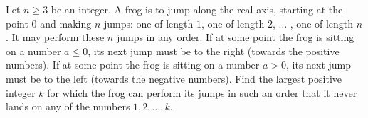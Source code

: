 Let $n \ge 3$ be an integer. A frog is to jump along the real axis, starting at the point $0$ and making $n$ jumps: one of length $1$,  one of length $2$,  $\dots$ , one of length $n$. It may perform these $n$ jumps in any order. If at some point the frog is sitting on a number $a \le 0$,  its next jump must be to the right (towards the positive numbers). If at some point the frog is sitting on a number $a > 0$,  its next jump must be to the left (towards the negative numbers). Find the largest positive integer $k$ for which the frog can perform its jumps in such an order that it never lands on any of the numbers $1, 2, \dots , k$.